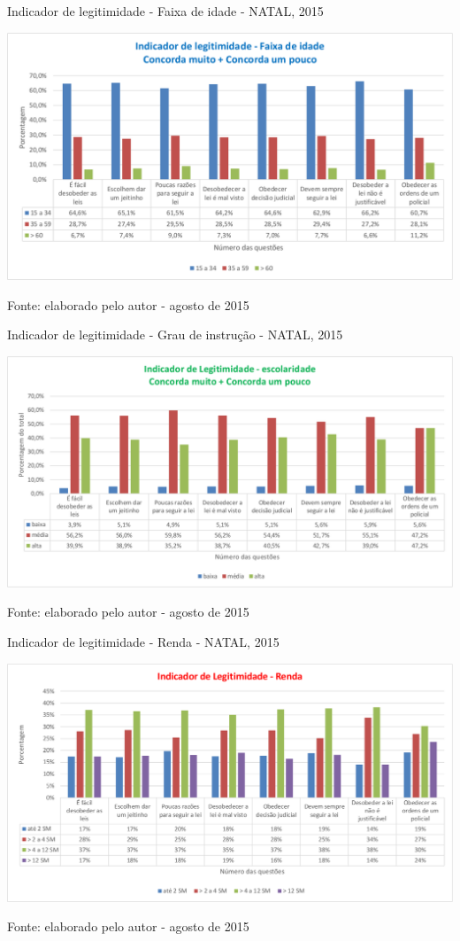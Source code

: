 \documentclass[
	12pt,				%
	openright,			%
	twoside,			%
	a4paper,			%
	chapter=TITLE,		%
	section=TITLE,		%
	subsection=TITLE,	%
	subsubsection=TITLE,%
	spanish,            %
	english,			%
	brazil				%
	]{abntex2}
\begin{document}
\begin{grafico}[!htpb]
	\caption{Indicador de legitimidade - Faixa de idade - NATAL, 2015}
	\begin{center}
		\includegraphics[scale=0.5]{Legitimidade-idade.png}
	\end{center}
	\ABNTEXchapterfont\small{Fonte: elaborado pelo autor - agosto de 2015}
	\label{Leg_idade}
\end{grafico}
\begin{grafico}[!htpb]
	\caption{Indicador de legitimidade - Grau de instrução - NATAL, 2015}
	\begin{center}
		\includegraphics[scale=0.5]{Legitimidade-escolaridade.png}
	\end{center}
	\ABNTEXchapterfont\small{Fonte: elaborado pelo autor - agosto de 2015}
	\label{Leg-escola}
\end{grafico}
\begin{grafico}[!htpb]
	\caption{Indicador de legitimidade - Renda - NATAL, 2015}
	\begin{center}
		\includegraphics[scale=0.5]{Legitimidade-renda.png}
	\end{center}
	\ABNTEXchapterfont\small{Fonte: elaborado pelo autor - agosto de 2015}
	\label{Leg-renda}
\end{grafico}
\end{document}
